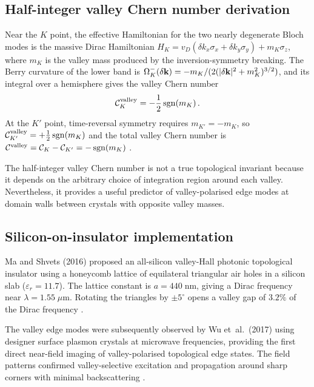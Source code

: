 \subsection{Half-integer valley Chern number derivation}

Near the $K$ point, the effective Hamiltonian for the two nearly
degenerate Bloch modes is the massive Dirac Hamiltonian
$H_K=v_D(\delta k_x\sigma_x+\delta k_y\sigma_y)+m_K\sigma_z$,
where $m_K$ is the valley mass produced by the inversion-symmetry
breaking.  The Berry curvature of the lower band is
$\Omega_K^-(\delta\mathbf{k})=-m_K/(2(|\delta\mathbf{k}|^2+m_K^2)^{3/2})$,
and its integral over a hemisphere gives the valley Chern number
\begin{equation}\label{eq:ch12-valley-chern-half-integer}
  \mathcal{C}_K^{\mathrm{valley}} = -\frac{1}{2}\operatorname{sgn}(m_K)\,.
\end{equation}
At the $K'$ point, time-reversal symmetry requires $m_{K'}=-m_K$,
so $\mathcal{C}_{K'}^{\mathrm{valley}}=+\frac{1}{2}\operatorname{sgn}(m_K)$ and the
total valley Chern number is
$\mathcal{C}^{\mathrm{valley}}=\mathcal{C}_K-\mathcal{C}_{K'}=-\operatorname{sgn}(m_K)$
\cite{ma2016all,dong2016valley}.

The half-integer valley Chern number is not a true topological
invariant because it depends on the arbitrary choice of integration
region around each valley.  Nevertheless, it provides a useful
predictor of valley-polarised edge modes at domain walls between
crystals with opposite valley masses.

\subsection{Silicon-on-insulator implementation}
\label{sec:ch12-soi-implementation}

Ma and Shvets (2016) proposed an all-silicon valley-Hall photonic
topological insulator using a honeycomb lattice of equilateral
triangular air holes in a silicon slab ($\varepsilon_r=11.7$).
The lattice constant is $a=440\;\mathrm{nm}$, giving a Dirac
frequency near $\lambda=1.55\;\mu\mathrm{m}$.  Rotating the
triangles by $\pm 5^\circ$ opens a valley gap of $3.2\%$ of the
Dirac frequency \cite{ma2016all,ozawa2018topological}.

The valley edge modes were subsequently observed by Wu et~al.\ (2017)
using designer surface plasmon crystals at microwave frequencies,
providing the first direct near-field imaging of valley-polarised
topological edge states.  The field patterns confirmed valley-selective
excitation and propagation around sharp corners with minimal
backscattering \cite{wu2017direct,gao2017valley}.

